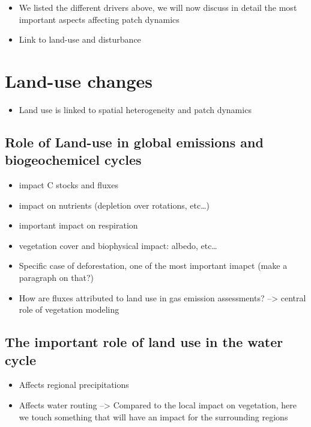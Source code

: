 \documentclass[oneside]{book}
\providecommand{\tightlist}{%
  \setlength{\itemsep}{0pt}\setlength{\parskip}{0pt}}
\begin{document}
\begin{itemize}
\tightlist
\item
  We listed the different drivers above, we will now discuss in detail
  the most important aspects affecting patch dynamics
\item
  Link to land-use and disturbance
\end{itemize}

\section{Land-use changes}\label{land-use-changes}

\begin{itemize}
\tightlist
\item
  Land use is linked to spatial heterogeneity and patch dynamics
\end{itemize}

\subsection{Role of Land-use in global emissions and biogeochemicel
cycles}\label{role-of-land-use-in-global-emissions-and-biogeochemicel-cycles}

\begin{itemize}
\tightlist
\item
  impact C stocks and fluxes
\item
  impact on nutrients (depletion over rotations, etc\ldots{})
\item
  important impact on respiration
\item
  vegetation cover and biophysical impact: albedo, etc\ldots{}
\item
  Specific case of deforestation, one of the most important imapct (make
  a paragraph on that?)
\item
  How are fluxes attributed to land use in gas emission assessments?
  --\textgreater{} central role of vegetation modeling
\end{itemize}

\subsection{The important role of land use in the water
cycle}\label{the-important-role-of-land-use-in-the-water-cycle}

\begin{itemize}
\tightlist
\item
  Affects regional precipitations
\item
  Affects water routing --\textgreater{} Compared to the local impact on
  vegetation, here we touch something that will have an impact for the
  surrounding regions
\end{itemize}
\end{document}
